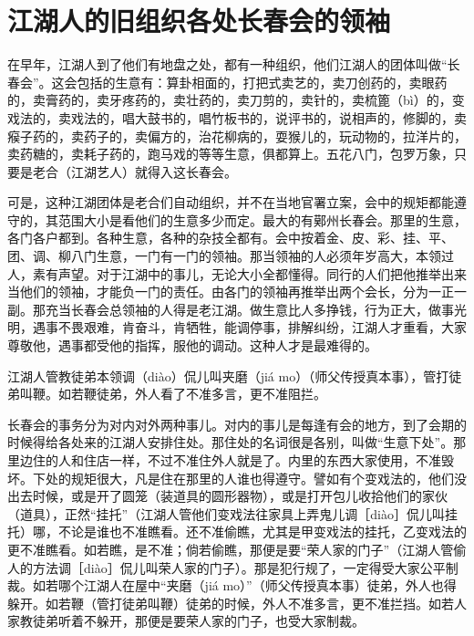 \documentclass[12pt,UTF8]{ctexbook}
\begin{document}
\section{江湖人的旧组织各处长春会的领袖}


在早年，江湖人到了他们有地盘之处，都有一种组织，他们江湖人的团体叫做“长春会”。这会包括的生意有：算卦相面的，打把式卖艺的，卖刀创药的，卖眼药的，卖膏药的，卖牙疼药的，卖壮药的，卖刀剪的，卖针的，卖梳篦（bì）的，变戏法的，卖戏法的，唱大鼓书的，唱竹板书的，说评书的，说相声的，修脚的，卖瘊子药的，卖药子的，卖偏方的，治花柳病的，耍猴儿的，玩动物的，拉洋片的，卖药糖的，卖耗子药的，跑马戏的等等生意，俱都算上。五花八门，包罗万象，只要是老合（江湖艺人）就得入这长春会。

可是，这种江湖团体是老合们自动组织，并不在当地官署立案，会中的规矩都能遵守的，其范围大小是看他们的生意多少而定。最大的有鄚州长春会。那里的生意，各门各户都到。各种生意，各种的杂技全都有。会中按着金、皮、彩、挂、平、团、调、柳八门生意，一门有一门的领袖。那当领袖的人必须年岁高大，本领过人，素有声望。对于江湖中的事儿，无论大小全都懂得。同行的人们把他推举出来当他们的领袖，才能负一门的责任。由各门的领袖再推举出两个会长，分为一正一副。那充当长春会总领袖的人得是老江湖。做生意比人多挣钱，行为正大，做事光明，遇事不畏艰难，肯奋斗，肯牺牲，能调停事，排解纠纷，江湖人才重看，大家尊敬他，遇事都受他的指挥，服他的调动。这种人才是最难得的。

江湖人管教徒弟本领调（diào）侃儿叫夹磨（jiá mo）（师父传授真本事），管打徒弟叫鞭。如若鞭徒弟，外人看了不准多言，更不准阻拦。



长春会的事务分为对内对外两种事儿。对内的事儿是每逢有会的地方，到了会期的时候得给各处来的江湖人安排住处。那住处的名词很是各别，叫做“生意下处”。那里边住的人和住店一样，不过不准住外人就是了。内里的东西大家使用，不准毁坏。下处的规矩很大，凡是住在那里的人谁也得遵守。譬如有个变戏法的，他们没出去时候，或是开了圆笼（装道具的圆形器物），或是打开包儿收拾他们的家伙（道具），正然“挂托”（江湖人管他们变戏法往家具上弄鬼儿调［diào］侃儿叫挂托）哪，不论是谁也不准瞧看。还不准偷瞧，尤其是甲变戏法的挂托，乙变戏法的更不准瞧看。如若瞧，是不准；倘若偷瞧，那便是要“荣人家的门子”（江湖人管偷人的方法调［diào］侃儿叫荣人家的门子）。那是犯行规了，一定得受大家公平制裁。如若哪个江湖人在屋中“夹磨（jiá mo）”（师父传授真本事）徒弟，外人也得躲开。如若鞭（管打徒弟叫鞭）徒弟的时候，外人不准多言，更不准拦挡。如若人家教徒弟听着不躲开，那便是要荣人家的门子，也受大家制裁。
\end{document}
